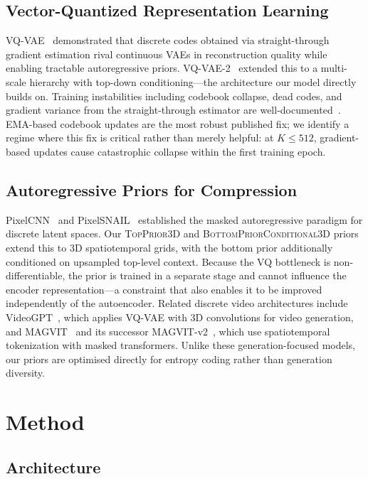 \documentclass[sigconf, screen, review, anonymous]{acmart}
\begin{document}
\subsection{Vector-Quantized Representation Learning}
VQ-VAE~\cite{oord2017vqvae} demonstrated that discrete codes obtained
via straight-through gradient estimation rival continuous VAEs in
reconstruction quality while enabling tractable autoregressive priors.
VQ-VAE-2~\cite{razavi2019vqvae2} extended this to a multi-scale
hierarchy with top-down conditioning---the architecture our model
directly builds on. Training instabilities including codebook collapse,
dead codes, and gradient variance from the straight-through estimator
are well-documented~\cite{huh2023commitment}. EMA-based codebook
updates are the most robust published fix; we identify a regime where
this fix is critical rather than merely helpful: at $K \leq 512$,
gradient-based updates cause catastrophic collapse within the first
training epoch.

\subsection{Autoregressive Priors for Compression}
PixelCNN~\cite{oord2016pixelcnn} and PixelSNAIL~\cite{chen2018pixelsnail}
established the masked autoregressive paradigm for discrete latent
spaces. Our \textsc{TopPrior3D} and \textsc{BottomPriorConditional3D}
priors extend this to 3D spatiotemporal grids, with the bottom prior
additionally conditioned on upsampled top-level context. Because the VQ
bottleneck is non-differentiable, the prior is trained in a separate
stage and cannot influence the encoder representation---a constraint
that also enables it to be improved independently of the autoencoder.
Related discrete video architectures include VideoGPT~\cite{yan2021videogpt},
which applies VQ-VAE with 3D convolutions for video generation, and
MAGVIT~\cite{yu2023magvit} and its successor MAGVIT-v2~\cite{yu2024magvit2},
which use spatiotemporal tokenization with masked transformers. Unlike
these generation-focused models, our priors are optimised directly
for entropy coding rather than generation diversity.

\section{Method}
\label{sec:method}

\subsection{Architecture}
\label{sec:arch}
\end{document}
